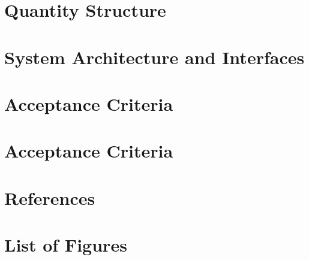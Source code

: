\documentclass[12pt]{article}
\theoremstyle{definition}
\begin{document}
\pagebreak

\section{Quantity Structure}

\pagebreak

\section{System Architecture and Interfaces}

\pagebreak

\section{Acceptance Criteria}

\pagebreak

\section{Acceptance Criteria}

\pagebreak

\section{References}

\pagebreak

\section{List of Figures}

\pagebreak
\end{document}
